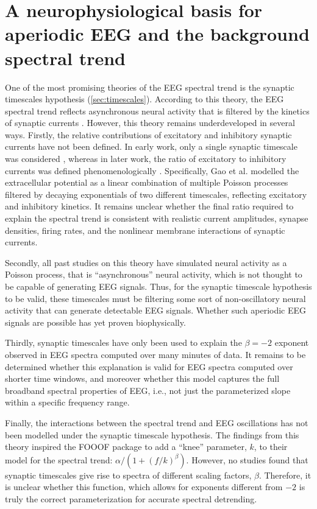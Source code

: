 \chapter{A neurophysiological basis for aperiodic EEG and the background spectral trend} \label{sec:natcomms}

One of the most promising theories of the EEG spectral trend is the synaptic timescales hypothesis (\autoref{sec:timescales}). According to this theory, the EEG spectral trend reflects asynchronous neural activity that is filtered by the kinetics of synaptic currents \cite{Bedard2006,Miller2009, Gao2017}. However, this theory remains underdeveloped in several ways. Firstly, the relative contributions of excitatory and inhibitory synaptic currents have not been defined. In early work, only a single synaptic timescale was considered \cite{Bedard2006,Miller2009}, whereas in later work, the ratio of excitatory to inhibitory currents was defined phenomenologically \cite{Gao2017}. Specifically, Gao et al. \cite{Gao2017} modelled the extracellular potential as a linear combination of multiple Poisson processes filtered by decaying exponentials of two different timescales, reflecting excitatory and inhibitory kinetics. It remains unclear whether the final ratio required to explain the spectral trend is consistent with realistic current amplitudes, synapse densities, firing rates, and the nonlinear membrane interactions of synaptic currents. 

Secondly, all past studies on this theory have simulated neural activity as a Poisson process, that is ``asynchronous'' neural activity, which is not thought to be capable of generating EEG signals. Thus, for the synaptic timescale hypothesis to be valid, these timescales must be filtering some sort of non-oscillatory neural activity that can generate detectable EEG signals. Whether such aperiodic EEG signals are possible has yet proven biophysically.

Thirdly, synaptic timescales have only been used to explain the $\beta=-2$ exponent observed in EEG spectra computed over many minutes of data. It remains to be determined whether this explanation is valid for EEG spectra computed over shorter time windows, and moreover whether this model captures the full broadband spectral properties of EEG, i.e., not just the parameterized slope within a specific frequency range. 

Finally, the interactions between the spectral trend and EEG oscillations has not been modelled under the synaptic timescale hypothesis. The findings from this theory inspired the FOOOF package to add a ``knee'' parameter, $k$, to their model for the spectral trend: $\alpha/(1+(f/k)^\beta)$. However, no studies found that synaptic timescales give rise to spectra of different scaling factors, $\beta$. Therefore, it is unclear whether this function, which allows for exponents different from $-2$ is truly the correct parameterization for accurate spectral detrending.

